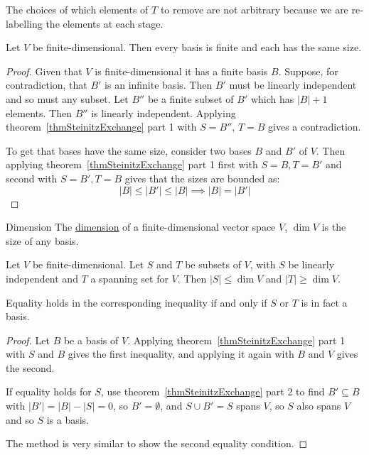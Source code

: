 \documentclass[../Main.tex]{subfiles}
\begin{document}
\begin{remark}
    The choices of which elements of $T$ to remove are not arbitrary because we are re-labelling the elements at each stage.
\end{remark}
\begin{corollary}
    Let $V$ be finite-dimensional. Then every basis is finite and each has the same size.
    \label{corBasesSameSize}
\end{corollary}
\begin{proof}
    Given that $V$ is finite-dimensional it has a finite basis $B$. Suppose, for contradiction, that $B'$ is an infinite basis. Then $B'$ must be linearly independent and so must any subset. Let $B''$ be a finite subset of $B'$ which has $|B| + 1$ elements. Then $B''$ is linearly independent. Applying theorem~\ref{thmSteinitzExchange} part 1 with $S = B''$, $T = B$ gives a contradiction.

    To get that bases have the same size, consider two bases $B$ and $B'$ of $V$. Then applying theorem~\ref{thmSteinitzExchange} part 1 first with $S = B, T = B'$ and second with $S = B', T = B$ gives that the sizes are bounded as:
    \begin{equation*}
        |B| \leq |B'| \leq |B| \implies |B| = |B'|
    \end{equation*}
\end{proof}
\begin{definition}{Dimension}
    The \underline{dimension} of a finite-dimensional vector space $V$, $\dim{V}$ is the size of any basis.
\end{definition}
\begin{corollary}
    Let $V$ be finite-dimensional. Let $S$ and $T$ be subsets of $V$, with $S$ be linearly independent and $T$ a spanning set for $V$. Then $|S| \leq \dim{V}$ and $|T| \geq \dim{V}$.

    Equality holds in the corresponding inequality if and only if $S$ or $T$ is in fact a basis.
    \label{corSpanLISizes}
\end{corollary}
\begin{proof}
    Let $B$ be a basis of $V$. Applying theorem~\ref{thmSteinitzExchange} part 1 with $S$ and $B$ gives the first inequality, and applying it again with $B$ and $V$ gives the second.

    If equality holds for $S$, use theorem~\ref{thmSteinitzExchange} part 2 to find $B' \subseteq B$ with $|B'| = |B| - |S| = 0$, so $B' = \emptyset$, and $S \cup B' = S$ spans $V$, so $S$ also spans $V$ and so $S$ is a basis.

    The method is very similar to show the second equality condition.
\end{proof}
\end{document}
